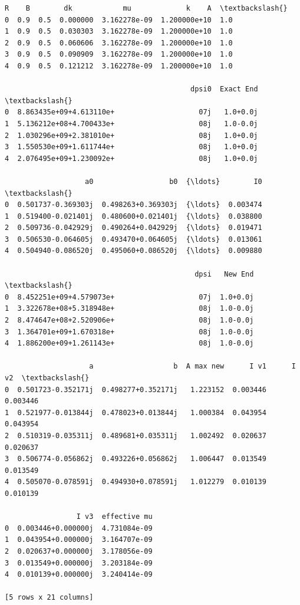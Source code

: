 \documentclass[11pt]{article}
\makeatletter
\newcommand{\boxspacing}{\kern\kvtcb@left@rule\kern\kvtcb@boxsep}
\newcommand{\prompt}[4]{
        {\ttfamily\llap{{\color{#2}[#3]:\hspace{3pt}#4}}\vspace{-\baselineskip}}
    }
\makeatother
\begin{document}
            \begin{tcolorbox}[breakable, size=fbox, boxrule=.5pt, pad at break*=1mm, opacityfill=0]
\prompt{Out}{outcolor}{8}{\boxspacing}
\begin{Verbatim}[commandchars=\\\{\}]
     R    B        dk            mu             k    A  \textbackslash{}
0  0.9  0.5  0.000000  3.162278e-09  1.200000e+10  1.0
1  0.9  0.5  0.030303  3.162278e-09  1.200000e+10  1.0
2  0.9  0.5  0.060606  3.162278e-09  1.200000e+10  1.0
3  0.9  0.5  0.090909  3.162278e-09  1.200000e+10  1.0
4  0.9  0.5  0.121212  3.162278e-09  1.200000e+10  1.0

                                            dpsi0  Exact End  \textbackslash{}
0  8.863435e+09+4.613110e+                    07j   1.0+0.0j
1  5.136212e+08+4.700433e+                    08j   1.0-0.0j
2  1.030296e+09+2.381010e+                    08j   1.0+0.0j
3  1.550530e+09+1.611744e+                    08j   1.0+0.0j
4  2.076495e+09+1.230092e+                    08j   1.0+0.0j

                   a0                  b0  {\ldots}        I0  \textbackslash{}
0  0.501737-0.369303j  0.498263+0.369303j  {\ldots}  0.003474
1  0.519400-0.021401j  0.480600+0.021401j  {\ldots}  0.038800
2  0.509736-0.042929j  0.490264+0.042929j  {\ldots}  0.019471
3  0.506530-0.064605j  0.493470+0.064605j  {\ldots}  0.013061
4  0.504940-0.086520j  0.495060+0.086520j  {\ldots}  0.009880

                                             dpsi   New End  \textbackslash{}
0  8.452251e+09+4.579073e+                    07j  1.0+0.0j
1  3.322678e+08+5.318948e+                    08j  1.0-0.0j
2  8.474647e+08+2.520906e+                    08j  1.0-0.0j
3  1.364701e+09+1.670318e+                    08j  1.0-0.0j
4  1.886200e+09+1.261143e+                    08j  1.0-0.0j

                    a                   b  A max new      I v1      I v2  \textbackslash{}
0  0.501723-0.352171j  0.498277+0.352171j   1.223152  0.003446  0.003446
1  0.521977-0.013844j  0.478023+0.013844j   1.000384  0.043954  0.043954
2  0.510319-0.035311j  0.489681+0.035311j   1.002492  0.020637  0.020637
3  0.506774-0.056862j  0.493226+0.056862j   1.006447  0.013549  0.013549
4  0.505070-0.078591j  0.494930+0.078591j   1.012279  0.010139  0.010139

                 I v3  effective mu
0  0.003446+0.000000j  4.731084e-09
1  0.043954+0.000000j  3.164707e-09
2  0.020637+0.000000j  3.178056e-09
3  0.013549+0.000000j  3.203184e-09
4  0.010139+0.000000j  3.240414e-09

[5 rows x 21 columns]
\end{Verbatim}
\end{tcolorbox}
        
\end{document}

